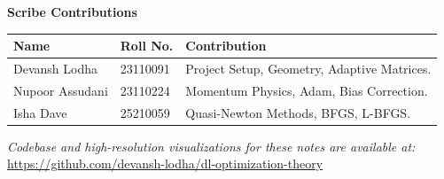 \documentclass[12pt]{article}
\begin{document}
    \MakeScribeTop

    \begin{center}
    \textbf{Scribe Contributions} \\
    \vspace{2mm}
    \begin{tabular}{|l|l|>{\raggedright\arraybackslash}p{8.5cm}|}
    \hline
    \textbf{Name} & \textbf{Roll No.} & \textbf{Contribution} \\ \hline
    Devansh Lodha            & 23110091          & Project Setup, Geometry, Adaptive Matrices.  \\
    Nupoor Assudani          & 23110224          & Momentum Physics, Adam, Bias Correction. \\
    Isha Dave                & 25210059          & Quasi-Newton Methods, BFGS, L-BFGS. \\
    \hline
    \end{tabular}
    \end{center}
    
    \vspace{2mm}
    \begin{center}
        \small \textit{Codebase and high-resolution visualizations for these notes are available at:} \\
        \url{https://github.com/devansh-lodha/dl-optimization-theory}
    \end{center}

    
    
    
    
    
    
    
    

    
    
\end{document}
